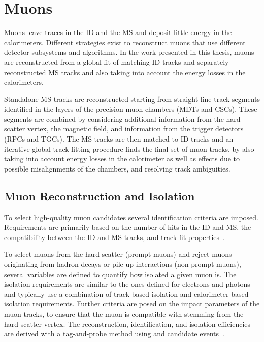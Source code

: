 
\section{Muons}
Muons leave traces in the ID and the MS and deposit little energy in the calorimeters.
Different strategies exist to reconstruct muons that use different detector subsystems and algorithms.
In the work presented in this thesis, muons are reconstructed from a global fit of matching ID tracks and separately reconstructed MS tracks and also taking into account the energy losses in the calorimeters.

Standalone MS tracks are reconstructed starting from straight-line track segments identified in the layers of the precision muon chambers (MDTs and CSCs).
These segments are combined by considering additional information from the hard scatter vertex, the magnetic field, and information from the trigger detectors (RPCs and TGCs). The MS tracks are then matched to ID tracks and an iterative global track fitting procedure finds the final set of muon tracks, by also taking into account energy losses in the calorimeter as well as effects due to possible misalignments of the chambers, and resolving track ambiguities. \cite{MUON-2018-03}

\subsection{Muon Reconstruction and Isolation}
To select high-quality muon candidates several identification criteria are imposed.
Requirements are primarily based on the number of hits in the ID and MS, the compatibility between the ID and MS tracks, and track fit properties~\cite{MUON-2018-03}.

To select muons from the hard scatter (prompt muons) and reject muons originating from hadron decays or pile-up interactions (non-prompt muons), several variables are defined to quantify how isolated a given muon is.
The isolation requirements are similar to the ones defined for electrons and photons and typically use a combination of track-based isolation and calorimeter-based isolation requirements.
Further criteria are posed on the impact parameters of the muon tracks, to ensure that the muon is compatible with stemming from the hard-scatter vertex.
The reconstruction, identification, and isolation efficiencies are derived with a tag-and-probe method using \Jpsimumu and \Zmumu candidate events~\cite{MUON-2018-03}.


